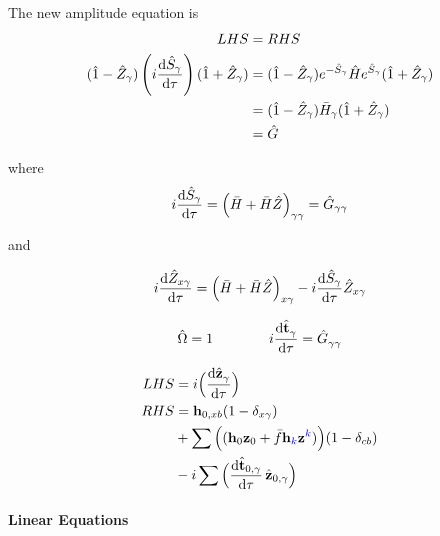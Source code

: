 \documentclass{article}
\newcommand{\bh}{\textbf{h}}
\newcommand{\bt}{\textbf{t}}
\newcommand{\bz}{\textbf{z}}
\begin{document}
The new amplitude equation is
\begin{align}
    LHS &= RHS
\\
    (\hat{1} - \hat{Z}_{\gamma})\left(i\dv{\hat{S}_{\gamma}}{\tau}\right)(\hat{1} + \hat{Z}_{\gamma})
    &= (\hat{1} - \hat{Z}_{\gamma})e^{-\hat{S}_{\gamma}}\hat{H}e^{\hat{S}_{\gamma}}(\hat{1} + \hat{Z}_{\gamma})
%
\\  &= (\hat{1} - \hat{Z}_{\gamma})\bar{H}_{\gamma}(\hat{1} + \hat{Z}_{\gamma})
\\  &= \hat{G}
\end{align}

where
\begin{align}
    i\dv{\hat{S}_{\gamma}}{\tau} = \left(\bar{H} + \bar{H}\hat{Z}\right)_{\gamma\gamma} = \hat{G}_{\gamma\gamma}
\end{align}

and

\begin{align}
    i\dv{\hat{Z}_{x\gamma}}{\tau} = \left(\bar{H} + \bar{H}\hat{Z}\right)_{x\gamma} - i\dv{\hat{S}_{\gamma}}{\tau}\hat{Z}_{x\gamma}
\end{align}

\clearpage
%
%
%
%
%
%


\vspace{2cm}%
%
%
%
%

\begin{equation}
    \hat{\Omega} = 1
\qquad\qquad
    i\dv{\hat{\bt}^{}_{\gamma}}{\tau} = \hat{G}^{}_{\gamma\gamma}
\end{equation}

%
%
%
%
%

\begin{align}\begin{split}
LHS &=
    i\Big(\dv{\hat{\bz}^{}_{\gamma}}{\tau}\Big)
\\ RHS &=
%
%
\bh_{0,xb}(1-\delta_{x\gamma})\\&+\sum\Big((\bh_0\bz_0 + \bar{f}\bh_{\blue{}\blue{k}\red{}}\bz^{\magenta{}\blue{k}\red{}})\Big)(1-\delta_{cb})\\&-i\sum\Big(\dv{\hat{\bt}_{0, \gamma}}{\tau}\,\hat{\bz}_{0, \gamma}\Big)
\end{split}\end{align}

\paragraph{Linear Equations}

%
%
%
%
%
\end{document}
